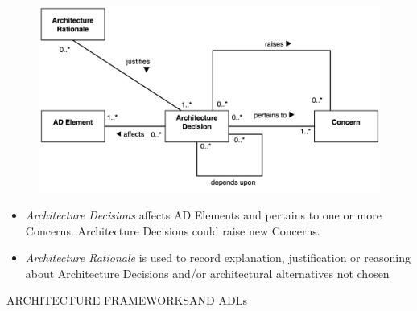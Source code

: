 		\begin{frame}
					\begin{figure}
						\begin{center}
							\includegraphics[width=\textwidth]{img/ConceptualModelRationale}
						\end{center}
					\end{figure}
		\end{frame}
		
		\begin{frame}
			\begin{itemize}
				\item \emph{Architecture Decisions} affects AD Elements and pertains to one or more Concerns. Architecture Decisions could raise new Concerns.
				\vspace{0.3cm}
				\item \emph{Architecture Rationale} is used to record explanation, justification or reasoning about Architecture Decisions and/or architectural alternatives not chosen
			\end{itemize}
		\end{frame}
		
		\begin{frame}
		\begin{center}
				\begin{LARGE}
					ARCHITECTURE FRAMEWORKS\newline\newline AND ADLs
				\end{LARGE}
			\end{center}
		\end{frame}
		
